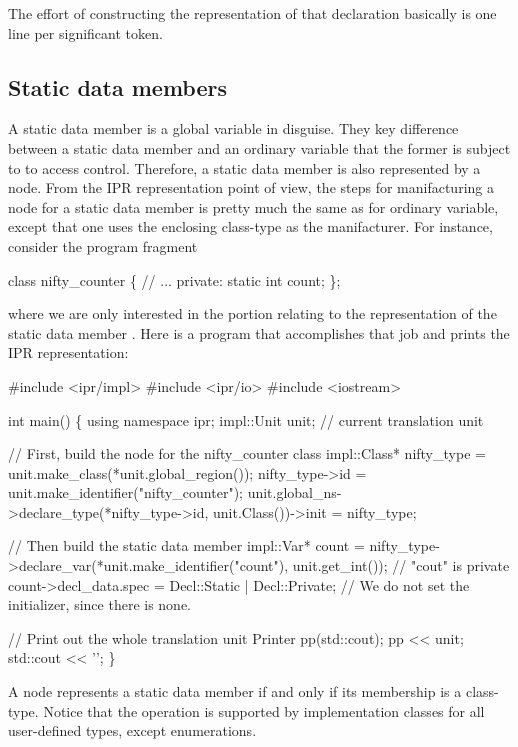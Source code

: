 \documentclass[11pt]{article}
\begin{document}
The effort of constructing the representation of that declaration basically is
one line per significant token. 


\subsection{Static data members}
\label{sec:named.data.static-member}

A static data member is a global variable in disguise.  They key difference
between a static data member and an ordinary variable that the former is
subject to to access control.  Therefore, a static data member is also
represented by a  node.  From the IPR representation point of view,
the steps for manifacturing a node for a static data member is pretty much
the same as for ordinary variable, except that one uses the enclosing
class-type as the manifacturer.  For instance, consider the program fragment 
\begin{Program}
  class nifty_counter \{
    // ...
  private:
     static int count;
  \};
\end{Program}
where we are only interested in the portion relating to the representation of
the static data member .  Here is a program that
accomplishes that job and prints the IPR representation:
\begin{Program}
#include <ipr/impl>
#include <ipr/io>
#include <iostream>

int main()
\{
   using namespace ipr;
   impl::Unit unit;              // current translation unit

   // First, build the node for the nifty_counter class
   impl::Class* nifty_type = unit.make_class(*unit.global_region());
   nifty_type->id = unit.make_identifier("nifty_counter");
   unit.global_ns->declare_type(*nifty_type->id, unit.Class())->init
      = nifty_type;
   
   // Then build the static data member
   impl::Var* count = nifty_type->declare_var(*unit.make_identifier("count"),
                                              unit.get_int());
   // "cout" is private 
   count->decl_data.spec = Decl::Static | Decl::Private;
   // We do not set the initializer, since there is none.
   
   // Print out the whole translation unit
   Printer pp(std::cout);
   pp << unit;
   std::cout << '';
\}
\end{Program}

A  node represents a static data member if and only if its
membership is a class-type.  Notice that the operation 
is supported by implementation classes for all user-defined types, except
enumerations. 
\end{document}
